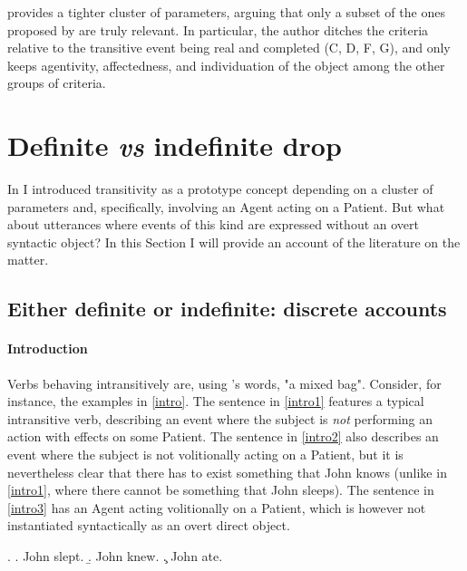 \textcite[78]{Lorenzetti2008} provides a tighter cluster of parameters, arguing that only a subset of the ones proposed by \textcite{HopperThompson1980} are truly relevant. In particular, the author ditches the criteria relative to the transitive event being real and completed (C, D, F, G), and only keeps agentivity, affectedness, and individuation of the object among the other groups of criteria.


\section{Definite \textit{vs} indefinite drop} 

In  I introduced transitivity as a prototype concept depending on a cluster of parameters and, specifically, involving an Agent acting on a Patient. But what about utterances where events of this kind are expressed without an overt syntactic object? In this Section I will provide an account of the literature on the matter.

\subsection{Either definite or indefinite: discrete accounts} 

\paragraph{Introduction}
Verbs behaving intransitively are, using \textcite[191]{rutherford1998workbook}'s words, "a mixed bag". Consider, for instance, the examples in \ref{intro}. The sentence in \ref{intro1} features a typical intransitive verb, describing an event where the subject is \textit{not} performing an action with effects on some Patient. The sentence in \ref{intro2} also describes an event where the subject is not volitionally acting on a Patient, but it is nevertheless clear that there has to exist something that John knows (unlike in \ref{intro1}, where there cannot be something that John sleeps). The sentence in \ref{intro3} has an Agent acting volitionally on a Patient, which is however not instantiated syntactically as an overt direct object.

\ex. \label{intro} \a. \label{intro1} John slept.
\b. \label{intro2} John knew.
\c. \label{intro3} John ate.

